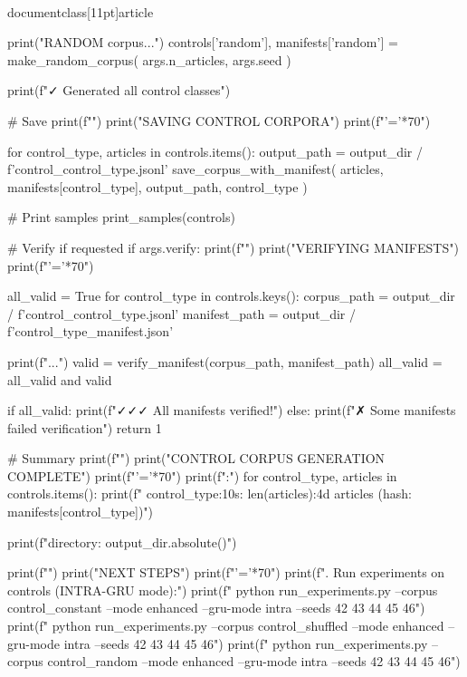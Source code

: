 \\documentclass[11pt]{article}
\begin{document}
\begin{CodeBlock}
{{{    print("\n[3/3] RANDOM corpus...")
    controls['random'], manifests['random'] = make_random_corpus(
        args.n_articles, args.seed
    )
    
    print(f"\n✓ Generated all control classes")
    
    # Save
    print(f"")
    print("SAVING CONTROL CORPORA")
    print(f"{'='*70}")
    
    for control_type, articles in controls.items():
        output_path = output_dir / f'control_{control_type}.jsonl'
        save_corpus_with_manifest(
            articles, 
            manifests[control_type],
            output_path,
            control_type
        )
    
    # Print samples
    print_samples(controls)
    
    # Verify if requested
    if args.verify:
        print(f"")
        print("VERIFYING MANIFESTS")
        print(f"{'='*70}")
        
        all_valid = True
        for control_type in controls.keys():
            corpus_path = output_dir / f'control_{control_type}.jsonl'
            manifest_path = output_dir / f'{control_type}_manifest.json'
            
            print(f"...")
            valid = verify_manifest(corpus_path, manifest_path)
            all_valid = all_valid and valid
        
        if all_valid:
            print(f"\n✓✓✓ All manifests verified!")
        else:
            print(f"\n✗ Some manifests failed verification")
            return 1
    
    # Summary
    print(f"")
    print("CONTROL CORPUS GENERATION COMPLETE")
    print(f"{'='*70}")
    print(f"\nGenerated:")
    for control_type, articles in controls.items():
        print(f"  {control_type:10s}: {len(articles):4d} articles (hash: {manifests[control_type]})")
    
    print(f"\nOutput directory: {output_dir.absolute()}")
    
    print(f"")
    print("NEXT STEPS")
    print(f"{'='*70}")
    print(f". Run experiments on controls (INTRA-GRU mode):")
    print(f"   python run_experiments.py --corpus control_constant --mode enhanced --gru-mode intra --seeds 42 43 44 45 46")
    print(f"   python run_experiments.py --corpus control_shuffled --mode enhanced --gru-mode intra --seeds 42 43 44 45 46")
    print(f"   python run_experiments.py --corpus control_random --mode enhanced --gru-mode intra --seeds 42 43 44 45 46")
    
}}}
\end{CodeBlock}
\end{document}
